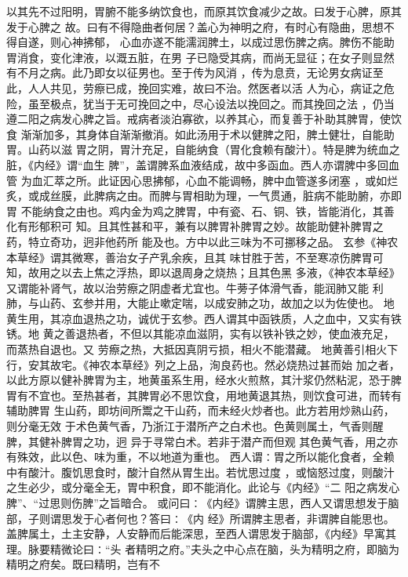 \documentclass[a4paper,12pt,UTF8,twoside]{ctexbook}
\begin{document}
以其先不过阳明，胃腑不能多纳饮食也，而原其饮食减少之故。曰发于心脾，原其发于心脾之 
故。曰有不得隐曲者何居？盖心为神明之府，有时心有隐曲，思想不得自遂，则心神拂郁， 
心血亦遂不能濡润脾土，以成过思伤脾之病。脾伤不能助胃消食，变化津液，以溉五脏，在男 
子已隐受其病，而尚无显征；在女子则显然有不月之病。此乃即女以征男也。至于传为风消 
，传为息贲，无论男女病证至此，人人共见，劳瘵已成，挽回实难，故曰不治。然医者以活 
人为心，病证之危险，虽至极点，犹当于无可挽回之中，尽心设法以挽回之。而其挽回之法 
，仍当遵二阳之病发心脾之旨。戒病者淡泊寡欲，以养其心，而复善于补助其脾胃，使饮食 
渐渐加多，其身体自渐渐撤消。如此汤用于术以健脾之阳，脾土健壮，自能助胃。山药以滋 
胃之阴，胃汁充足，自能纳食（胃化食赖有酸汁）。特是脾为统血之脏，《内经》谓“血生 
脾”，盖谓脾系血液结成，故中多函血。西人亦谓脾中多回血管 
为血汇萃之所。此证因心思拂郁，心血不能调畅，脾中血管遂多闭塞 
，或如烂炙，或成丝膜，此脾病之由。而脾与胃相助为理，一气贯通，脏病不能助腑，亦即胃 
不能纳食之由也。鸡内金为鸡之脾胃，中有瓷、石、铜、铁，皆能消化，其善化有形郁积可 
知。且其性甚和平，兼有以脾胃补脾胃之妙。故能助健补脾胃之药，特立奇功，迥非他药所 
能及也。方中以此三味为不可挪移之品。 
玄参《神农本草经》谓其微寒，善治女子产乳余疾，且其 
味甘胜于苦，不至寒凉伤脾胃可知，故用之以去上焦之浮热，即以退周身之烧热；且其色黑 
多液，《神农本草经》又谓能补肾气，故以治劳瘵之阴虚者尤宜也。牛蒡子体滑气香，能润肺又能 
利肺，与山药、玄参并用，大能止嗽定喘，以成安肺之功，故加之以为佐使也。 
地黄生用，其凉血退热之功，诚优于玄参。西人谓其中函铁质，人之血中，又实有铁锈。地 
黄之善退热者，不但以其能凉血滋阴，实有以铁补铁之妙，使血液充足，而蒸热自退也。又 
劳瘵之热，大抵因真阴亏损，相火不能潜藏。 
地黄善引相火下行，安其故宅。《神农本草经》列之上品，洵良药也。然必烧热过甚而始 
加之者，以此方原以健补脾胃为主，地黄虽系生用，经水火煎熬，其汁浆仍然粘泥，恐于脾 
胃有不宜也。至热甚者，其脾胃必不思饮食，用地黄退其热，则饮食可进，而转有辅助脾胃 
生山药，即坊间所鬻之干山药，而未经火炒者也。此方若用炒熟山药，则分毫无效 
于术色黄气香，乃浙江于潜所产之白术也。色黄则属土，气香则醒脾，其健补脾胃之功，迥 
异于寻常白术。若非于潜产而但观 
其色黄气香，用之亦有殊效，此以色、味为重，不以地道为重也。 
西人谓∶胃之所以能化食者，全赖中有酸汁。腹饥思食时，酸汁自然从胃生出。若忧思过度 
，或恼怒过度，则酸汁之生必少，或分毫全无，胃中积食，即不能消化。此论与《内经》“二 
阳之病发心脾”、“过思则伤脾”之旨暗合。 
或问曰∶《内经》谓脾主思，西人又谓思想发于脑部，子则谓思发于心者何也？答曰∶《内 
经》所谓脾主思者，非谓脾自能思也。盖脾属土，土主安静，人安静而后能深思，至西人谓思发于脑部，《内经》早寓其 
理。脉要精微论曰∶“头 
者精明之府。”夫头之中心点在脑，头为精明之府，即脑为精明之府矣。既曰精明，岂有不 
\end{document}
